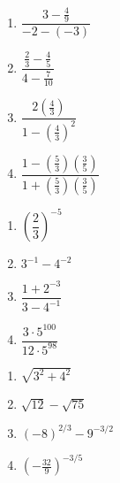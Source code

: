\begin{multicols}{4}
\begin{enumerate}
\setcounter{enumi}{\value{HW}}

\item  $\dfrac{3 - \frac{4}{9}}{-2 - (-3)}$
\item  $\dfrac{\frac{2}{3} - \frac{4}{5}}{4 - \frac{7}{10}}$
\item  $\dfrac{2\left(\frac{4}{3}\right)}{1 - \left(\frac{4}{3}\right)^2}$
\item  $\dfrac{1 - \left(\frac{5}{3}\right)\left(\frac{3}{5}\right)}{1 + \left(\frac{5}{3}\right)\left(\frac{3}{5}\right)}$

\setcounter{HW}{\value{enumi}}
\end{enumerate}
\end{multicols}

\begin{multicols}{4}
\begin{enumerate}
\setcounter{enumi}{\value{HW}}

\item  $\left(\dfrac{2}{3}\right)^{-5}$
\item  $3^{-1} - 4^{-2}$
\item  $\dfrac{1 + 2^{-3}}{3 - 4^{-1}}$ 
\item  $\dfrac{3\cdot 5^{100}}{12 \cdot 5^{98}}$

\setcounter{HW}{\value{enumi}}
\end{enumerate}
\end{multicols}

\begin{multicols}{4}
\begin{enumerate}
\setcounter{enumi}{\value{HW}}

\item  $\sqrt{3^2 + 4^2}$  
\item  $\sqrt{12} - \sqrt{75}$  
\item  $(-8)^{2/3} - 9^{-3/2}$ 
\item  $\left(-\frac{32}{9}\right)^{-3/5}$

\setcounter{HW}{\value{enumi}}
\end{enumerate}
\end{multicols}


